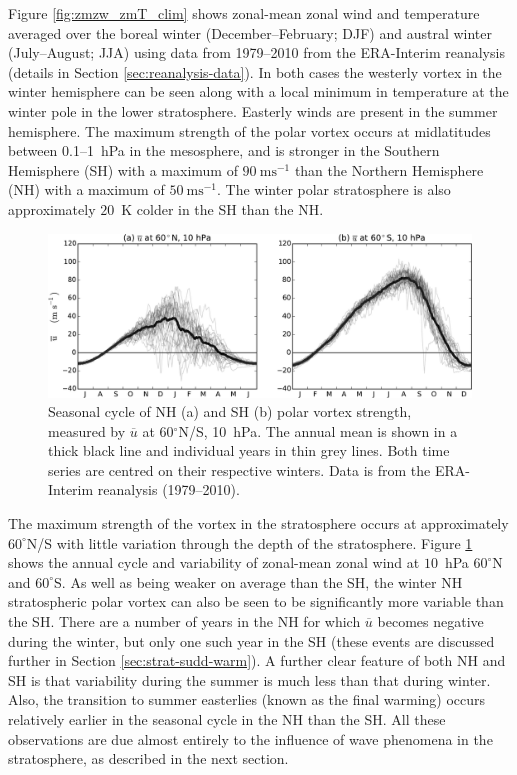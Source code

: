 Figure \ref{fig:zmzw_zmT_clim} shows zonal-mean zonal wind and temperature
averaged over the boreal winter (December--February; DJF) and austral winter
(July--August; JJA) using data from 1979--2010 from the ERA-Interim reanalysis
(details in Section \ref{sec:reanalysis-data}). In both cases the westerly
vortex in the winter hemisphere can be seen along with a local minimum in
temperature at the winter pole in the lower stratosphere. Easterly winds are
present in the summer hemisphere. The maximum strength of the polar vortex
occurs at midlatitudes between 0.1--1~hPa in the mesosphere, and is stronger in
the Southern Hemisphere (SH) with a maximum of $90~\mathrm{ms^{-1}}$ than the
Northern Hemisphere (NH) with a maximum of $50~\mathrm{ms^{-1}}$. The winter
polar stratosphere is also approximately $20$~K colder in the SH than the NH.

\begin{figure}
 \centering
 \noindent\includegraphics[width=\textwidth]{figures/chapter-intro/zmzw_NH_SH_fix.pdf}
 \caption[Comparison of NH and SH polar vortex seasonal cycle]{Seasonal cycle
   of NH (a) and SH (b) polar vortex strength, measured by $\overline{u}$ at
   60$^{\circ}$N/S, 10~hPa. The annual mean is shown in a thick black line and
   individual years in thin grey lines. Both time series are centred on their
   respective winters. Data is from the ERA-Interim reanalysis (1979--2010).}
 \label{fig:zmzw_NH_SH}
\end{figure}

The maximum strength of the vortex in the stratosphere occurs at approximately
$60^{\circ}$N/S with little variation through the depth of the
stratosphere. Figure \ref{fig:zmzw_NH_SH} shows the annual cycle and variability
of zonal-mean zonal wind at $10$~hPa $60^{\circ}$N and $60^{\circ}$S. As well as
being weaker on average than the SH, the winter NH stratospheric polar vortex
can also be seen to be significantly more variable than the SH. There are a
number of years in the NH for which $\overline{u}$ becomes negative during the
winter, but only one such year in the SH (these events are discussed further in
Section \ref{sec:strat-sudd-warm}). A further clear feature of both NH and SH is
that variability during the summer is much less than that during winter. Also,
the transition to summer easterlies (known as the final warming) occurs
relatively earlier in the seasonal cycle in the NH than the SH. All these
observations are due almost entirely to the influence of wave phenomena in the
stratosphere, as described in the next section.


